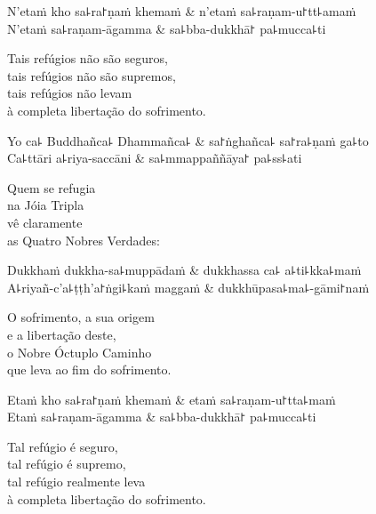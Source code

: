 \begin{twochants}
  N'etaṁ kho sa꜕ra꜓ṇaṁ khemaṁ & n'etaṁ sa꜕raṇam-u꜓tt꜕amaṁ \\
  N'etaṁ sa꜕raṇam-āgamma & sa꜕bba-dukkhā꜓ pa꜕mucca꜕ti \\
\end{twochants}

\begin{english}
  Tais refúgios não são seguros,\\
  tais refúgios não são supremos,\\
  tais refúgios não levam\\
  à completa libertação do sofrimento.
\end{english}

\begin{twochants}
  Yo ca꜕ Buddhañca꜕ Dhammañca꜕ & sa꜓ṅghañca꜕ sa꜓ra꜕ṇaṁ ga꜕to \\
  Ca꜕ttāri a꜕riya-saccāni & sa꜕mmappaññāya꜓ pa꜕ss꜕ati \\
\end{twochants}

\begin{english}
  Quem se refugia\\
  na Jóia Tripla\\
  vê claramente\\
  as Quatro Nobres Verdades:
\end{english}

\begin{twochants}
  Dukkhaṁ dukkha-sa꜕muppādaṁ & dukkhassa ca꜕ a꜕ti꜕kka꜕maṁ \\
  A꜕riyañ-c'a꜕ṭṭh'a꜓ṅgi꜕kaṁ maggaṁ & dukkhūpasa꜕ma꜕-gāmi꜓naṁ \\
\end{twochants}

\begin{english}
  O sofrimento, a sua origem \\
  e a libertação deste,\\
  o Nobre Óctuplo Caminho\\
  que leva ao fim do sofrimento.
\end{english}

\begin{twochants}
  Etaṁ kho sa꜕ra꜓ṇaṁ khemaṁ & etaṁ sa꜕raṇam-u꜓tta꜕maṁ \\
  Etaṁ sa꜕raṇam-āgamma & sa꜕bba-dukkhā꜓ pa꜕mucca꜕ti \\
\end{twochants}

\begin{english}
  Tal refúgio é seguro,\\
  tal refúgio é supremo,\\
  tal refúgio realmente leva\\
  à completa libertação do sofrimento.
\end{english}

